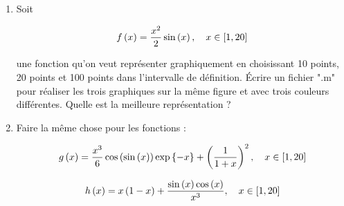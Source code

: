 \begin{enumerate}[label=\alph*)]
  \item Soit
  
  \begin{equation*}
    f \left(x\right) = \dfrac{x^{2}}{2} \sin \left(x\right), 
    \quad x \in \left[1, 20\right]
  \end{equation*}
  
  une fonction qu'on veut représenter graphiquement en choisissant 10 points, 20 points et 100 points dans l'intervalle de définition. Écrire un fichier ".m" pour réaliser les trois graphiques sur la même figure et avec trois couleurs différentes. Quelle est la meilleure représentation ?
  
  \item Faire la même chose pour les fonctions :
  
  \begin{equation*}
    g \left(x\right) = \dfrac{x^{3}}{6} \cos \left(\sin \left(x\right)\right) \exp\left\{-x\right\} + \left(\dfrac{1}{1+x}\right)^{2}, 
    \quad x \in \left[1, 20\right]
  \end{equation*}
  
  \begin{equation*}
    h \left(x\right) = x \left(1 - x\right) + \dfrac{\sin \left(x\right) \cos \left(x\right)}{x^3},
    \quad x \in \left[1, 20\right]
  \end{equation*}
\end{enumerate}



